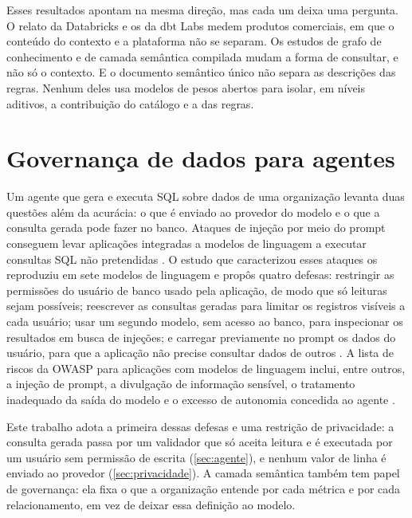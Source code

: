 Esses resultados apontam na mesma direção, mas cada um deixa uma
pergunta. O relato da Databricks e os da dbt Labs medem produtos
comerciais, em que o conteúdo do contexto e a plataforma não se separam.
Os estudos de grafo de conhecimento e de camada semântica compilada
mudam a forma de consultar, e não só o contexto. E o documento semântico
único não separa as descrições das regras. Nenhum deles usa modelos de
pesos abertos para isolar, em níveis aditivos, a contribuição do catálogo
e a das regras.

\section{Governança de dados para agentes}
\label{sec:governanca}

Um agente que gera e executa SQL sobre dados de uma organização levanta
duas questões além da acurácia: o que é enviado ao provedor do modelo e o
que a consulta gerada pode fazer no banco. Ataques de injeção por meio do
prompt conseguem levar aplicações integradas a modelos de linguagem a
executar consultas SQL não pretendidas \cite{pedro2025prompt}. O estudo
que caracterizou esses ataques os reproduziu em sete modelos de linguagem
e propôs quatro defesas: restringir as permissões do usuário de banco
usado pela aplicação, de modo que só leituras sejam possíveis; reescrever
as consultas geradas para limitar os registros visíveis a cada usuário;
usar um segundo modelo, sem acesso ao banco, para inspecionar os
resultados em busca de injeções; e carregar previamente no prompt os
dados do usuário, para que a aplicação não precise consultar dados de
outros \cite{pedro2025prompt}. A lista de riscos da OWASP para aplicações
com modelos de linguagem inclui, entre outros, a injeção de prompt, a
divulgação de informação sensível, o tratamento inadequado da saída do
modelo e o excesso de autonomia concedida ao agente
\cite{owasp2025llm}.

Este trabalho adota a primeira dessas defesas e uma restrição de
privacidade: a consulta gerada passa por um validador que só aceita
leitura e é executada por um usuário sem permissão de escrita
(\autoref{sec:agente}), e nenhum valor de linha é enviado ao provedor
(\autoref{sec:privacidade}). A camada semântica também tem papel de
governança: ela fixa o que a organização entende por cada métrica e por
cada relacionamento, em vez de deixar essa definição ao modelo.

